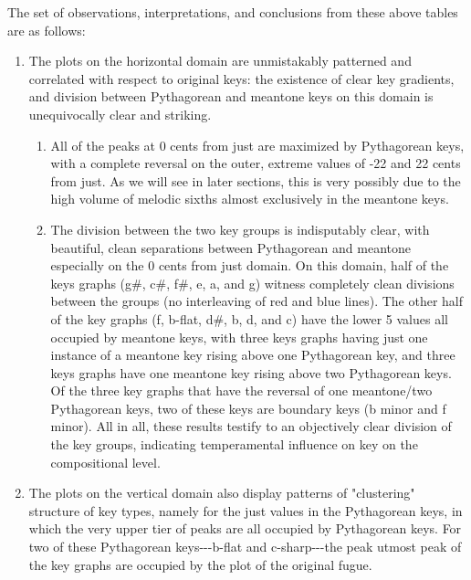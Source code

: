 The set of observations, interpretations, and conclusions from these
above tables are as follows:

\begin{enumerate}
\def\labelenumi{\arabic{enumi}.}
\tightlist
\item
  The plots on the horizontal domain are unmistakably patterned and
  correlated with respect to original keys: the existence of clear key
  gradients, and division between Pythagorean and meantone keys on this
  domain is unequivocally clear and striking.

  \begin{enumerate}
  \def\labelenumii{\arabic{enumii}.}
  \tightlist
  \item
    All of the peaks at 0 cents from just are maximized by Pythagorean
    keys, with a complete reversal on the outer, extreme values of -22
    and 22 cents from just. As we will see in later sections, this is
    very possibly due to the high volume of melodic sixths almost
    exclusively in the meantone keys.
  \item
    The division between the two key groups is indisputably clear, with
    beautiful, clean separations between Pythagorean and meantone
    especially on the 0 cents from just domain. On this domain, half of
    the keys graphs (g\#, c\#, f\#, e, a, and g) witness completely
    clean divisions between the groups (no interleaving of red and blue
    lines). The other half of the key graphs (f, b-flat, d\#, b, d, and
    c) have the lower 5 values all occupied by meantone keys, with three
    keys graphs having just one instance of a meantone key rising above
    one Pythagorean key, and three keys graphs have one meantone key
    rising above two Pythagorean keys. Of the three key graphs that have
    the reversal of one meantone/two Pythagorean keys, two of these keys
    are boundary keys (b minor and f minor). All in all, these results
    testify to an objectively clear division of the key groups,
    indicating temperamental influence on key on the compositional
    level.
  \end{enumerate}
\item
  The plots on the vertical domain also display patterns of "clustering"
  structure of key types, namely for the just values in the Pythagorean
  keys, in which the very upper tier of peaks are all occupied by
  Pythagorean keys. For two of these Pythagorean keys-\/-\/-b-flat and
  c-sharp-\/-\/-the peak utmost peak of the key graphs are occupied by
  the plot of the original fugue.
\end{enumerate}

